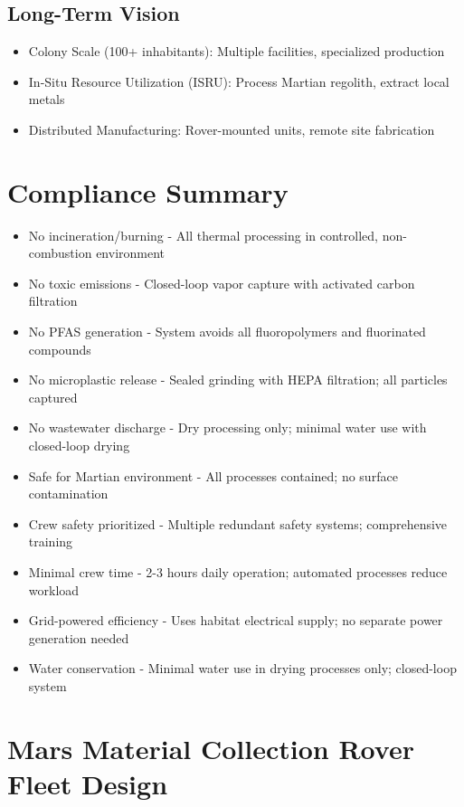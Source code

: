 \documentclass[12pt, a4paper]{article}
\begin{document}
\subsection{Long-Term Vision}
\begin{itemize}
    \item Colony Scale (100+ inhabitants): Multiple facilities, specialized production
    \item In-Situ Resource Utilization (ISRU): Process Martian regolith, extract local metals
    \item Distributed Manufacturing: Rover-mounted units, remote site fabrication
\end{itemize}

\section{Compliance Summary}

\begin{itemize}
    \item No incineration/burning - All thermal processing in controlled, non-combustion environment
    \item No toxic emissions - Closed-loop vapor capture with activated carbon filtration
    \item No PFAS generation - System avoids all fluoropolymers and fluorinated compounds
    \item No microplastic release - Sealed grinding with HEPA filtration; all particles captured
    \item No wastewater discharge - Dry processing only; minimal water use with closed-loop drying
    \item Safe for Martian environment - All processes contained; no surface contamination
    \item Crew safety prioritized - Multiple redundant safety systems; comprehensive training
    \item Minimal crew time - 2-3 hours daily operation; automated processes reduce workload
    \item Grid-powered efficiency - Uses habitat electrical supply; no separate power generation needed
    \item Water conservation - Minimal water use in drying processes only; closed-loop system
\end{itemize}

\section{Mars Material Collection Rover Fleet Design}
\end{document}
